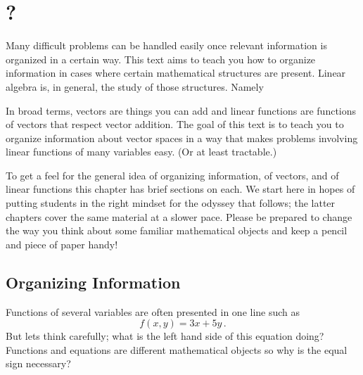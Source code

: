 \chapter{\whatIsTitle?}\label{warmup}


Many difficult problems can be handled easily 
once  relevant information is organized in a certain way. 
This text aims to teach you how to organize information in cases where certain mathematical structures are present. 
Linear algebra is, in general, the study of those structures. Namely

\vspace{3mm}
\vspace{3mm}

\noindent In broad terms, vectors are things you can add and  linear functions are %
functions of vectors that respect vector addition. 
The goal of this text is to teach you to organize information about vector spaces in a way that makes problems involving linear functions of many variables easy. 
(Or at least tractable.) 

To get a feel for the general idea of organizing information, of vectors, and of linear functions this chapter has brief sections on each. 
We start here in hopes of putting students in the right mindset for the 
odyssey that follows; the latter chapters cover the same material at a slower pace.  
Please be prepared to change the way you think about some familiar mathematical objects
and keep a pencil and piece of paper handy!

\section{Organizing Information}
\label{organize}
Functions of several variables are often presented in one line such as 
$$f(x,y)=3x+5y\,.$$
But lets think carefully; what is the left hand side of this equation doing? 
Functions and equations are different mathematical objects so why is the equal sign necessary?


